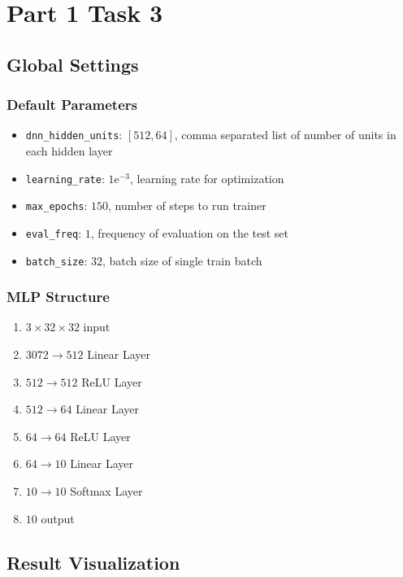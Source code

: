 \section{Part 1 Task 3}

\subsection{Global Settings}

\subsubsection{Default Parameters}

\begin{itemize}
  \item \texttt{dnn\_hidden\_units}: $[512, 64]$, comma separated list of number of units in each hidden layer
  \item \texttt{learning\_rate}: $1\mathrm{e}^{-3}$, learning rate for optimization
  \item \texttt{max\_epochs}: $150$, number of steps to run trainer
  \item \texttt{eval\_freq}: $1$, frequency of evaluation on the test set
  \item \texttt{batch\_size}: $32$, batch size of single train batch
\end{itemize}

\subsubsection{MLP Structure}

\begin{enumerate}
  \item $3 \times 32 \times 32$ input
  \item $3072 \to 512 $ Linear Layer
  \item $512 \to 512 $ ReLU Layer
  \item $512 \to 64 $ Linear Layer
  \item $64 \to 64 $ ReLU Layer
  \item $64 \to 10 $ Linear Layer
  \item $10 \to 10$ Softmax Layer
  \item $10$ output
\end{enumerate}

\subsection{Result Visualization}


